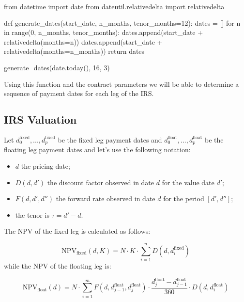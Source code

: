 \begin{ipython}
from datetime import date
from dateutil.relativedelta import relativedelta

def generate_dates(start_date, n_months, tenor_months=12):
    dates = []
    for n in range(0, n_months, tenor_months):
        dates.append(start_date + relativedelta(months=n))
    dates.append(start_date + relativedelta(months=n_months))
    return dates
    
generate_dates(date.today(), 16, 3)
\end{ipython}
\begin{ioutput}
\end{ioutput}
       
Using this function and the contract parameters we will be able to determine a sequence of payment dates for each leg of the IRS.

\subsection{IRS Valuation}
\label{irs-valuation}
Let \(d_0^{\mathrm{fixed}},...,d_p^{\mathrm{fixed}}\) be the fixed leg payment dates and \(d_0^{\mathrm{float}},...,d_p^{\mathrm{float}}\) be the floating leg payment dates and let's use the following notation:

\begin{itemize}
\tightlist
\item
  \(d\) the pricing date;
\item
  \(D(d, d')\) the discount factor observed in date \(d\) for the value date \(d'\);
\item
  \(F(d, d', d'')\) the forward rate observed in date \(d\) for the period \([d', d'']\); 
  \item the tenor is \(\tau = d' - d\).
\end{itemize}
The NPV of the fixed leg is calculated as follows:

\begin{equation}
\mathrm{NPV}_{\mathrm{fixed}}(d, K) = N\cdot K\cdot\sum_{i=1}^{n}D(d, d_{i}^{\mathrm{fixed}})\end{equation}
while the NPV of the floating leg is:

\begin{equation}\mathrm{NPV}_{\mathrm{float}}(d) = N\cdot\sum_{i=1}^{m}F(d, d_{j-1}^{\mathrm{float}}, d_{j}^{\mathrm{float}}) \cdot \frac{d_{j}^{\mathrm{float}}-d_{j-1}^{\mathrm{float}}}{360}
\cdot D(d, d_{i}^{\mathrm{float}})\end{equation}

